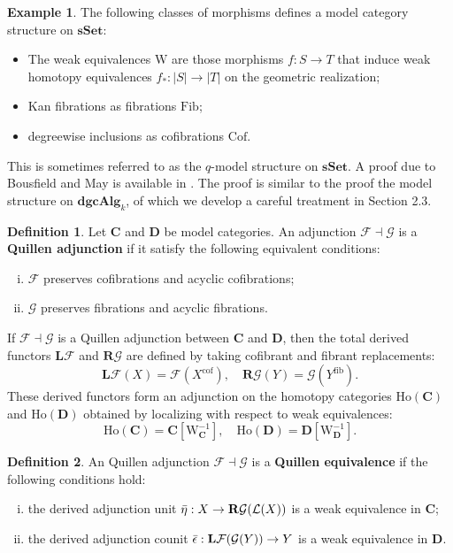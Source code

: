 \documentclass[psamsfonts]{amsart}
\theoremstyle{definition}
\newtheorem{defn}{Definition}[section]
\newtheorem{exmp}{Example}[section]
\newcommand{\sSet}{\mathbf{sSet}}
\newcommand{\dgcAlg}{\mathbf{dgcAlg}}
\newcommand{\Ho}{\mathrm{Ho}}
\newcommand{\W}{\mathrm{W}}
\newcommand{\Fib}{\mathrm{Fib}}
\newcommand{\Cof}{\mathrm{Cof}}
\newcommand{\cof}{\mathrm{cof}}
\newcommand{\fib}{\mathrm{fib}}
\numberwithin{equation}{section}
\begin{document}
\begin{exmp}
The following classes of morphisms defines a model category structure on $\sSet$:
\begin{itemize}
    \item The weak equivalences $\W$ are those morphisms $f:S\to T$ that induce weak homotopy equivalences $f_\ast:|S|\to|T|$ on the geometric realization;
    \item Kan fibrations as fibrations $\Fib$;
    \item degreewise inclusions as cofibrations $\Cof$.
\end{itemize}
This is sometimes referred to as the $q$-model structure on $\sSet$. A proof due to Bousfield and May is available in \cite{May-Ponto}. The proof is similar to the proof the model structure on $\dgcAlg_k$, of which we develop a careful treatment in Section 2.3.
\end{exmp}

\begin{defn}
Let $\mathbf{C}$ and $\mathbf{D}$ be model categories. An adjunction $\mathcal{F}\dashv\mathcal{G}$ is a \textbf{Quillen adjunction} if it satisfy the following equivalent conditions:\begin{enumerate}[(i)]
    \item $\mathcal{F}$ preserves cofibrations and acyclic cofibrations;
    \item $\mathcal{G}$ preserves fibrations and acyclic fibrations.
\end{enumerate}
\end{defn}

If $\mathcal{F}\dashv\mathcal{G}$ is a Quillen adjunction between $\mathbf{C}$ and $\mathbf{D}$, then the total derived functors $\mathbf{L}\mathcal{F}$ and $\mathbf{R}\mathcal{G}$ are defined by taking cofibrant and fibrant replacements:
\[\mathbf{L}\mathcal{F}(X)=\mathcal{F}(X^\cof),\quad\mathbf{R}\mathcal{G}(Y)=\mathcal{G}(Y^\fib).\]
These derived functors form an adjunction on the homotopy categories $\Ho(\mathbf{C})$ and $\Ho(\mathbf{D})$ obtained by localizing with respect to weak equivalences:
\[\Ho(\mathbf{C})=\mathbf{C}[\W_\mathbf{C}^{-1}],\quad\Ho(\mathbf{D})=\mathbf{D}[\W_\mathbf{D}^{-1}].\]

\begin{defn}
An Quillen adjunction $\mathcal{F}\dashv\mathcal{G}$ is a \textbf{Quillen equivalence} if the following conditions hold:\begin{enumerate}[(i)]
    \item the derived adjunction unit $\Bar{\eta}:X\to\mathbf{R}\mathcal{G}(\mathcal{L}(X))$ is a weak equivalence in $\mathbf{C}$;
    \item the derived adjunction counit $\Bar{\epsilon}:\mathbf{L}\mathcal{F}(\mathcal{G}(Y))\to Y$ is a weak equivalence in $\mathbf{D}$.
\end{enumerate}
\end{defn}
\end{document}
